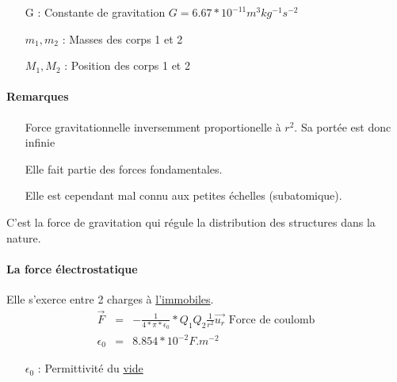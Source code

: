 \begin{itemize}
	\item[G :] Constante de gravitation $G=6.67*10^{-11} m^3kg^{-1}s^{-2}$
	\item[$m_1, m_2$ :] Masses des corps 1 et 2
	\item[$M_1, M_2$ :] Position des corps 1 et 2
\end{itemize}

\paragraph{Remarques}

\begin{itemize}
	\item[] Force gravitationnelle inversemment proportionelle à $r^2$. Sa portée est donc infinie
	\item[] Elle fait partie des forces fondamentales.
	\item[] Elle est cependant mal connu aux petites échelles (subatomique).
\end{itemize}
C'est la force de gravitation qui régule la distribution des structures dans la nature.

\paragraph{La force électrostatique}
\begin{wrapfigure}{r}{0pt}
\end{wrapfigure}
Elle s'exerce entre 2 charges à \ul{l'immobiles}.
\begin{align*}
	\overrightarrow{F} &=& -\frac{1}{4*\pi*\epsilon_0}*{Q_1Q_2}\frac{1}{r^2}\vec{u_r} \text{ Force de coulomb}\\
	\epsilon_0 &=& 8.854*10^{-2} F.m ^{-2} 
\end{align*}
\begin{itemize}
	\item[$\epsilon_0$ : ] Permittivité du \ul{vide}
\end{itemize}

